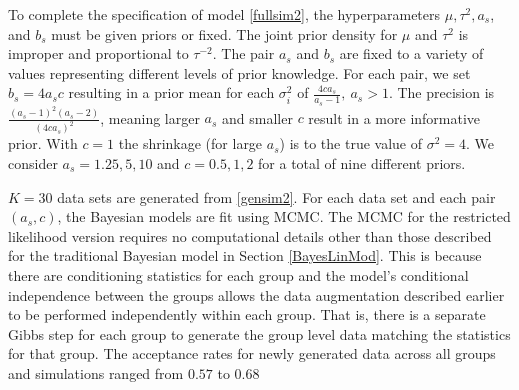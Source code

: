 \documentclass[ba]{imsart}
\newcommand{\response}[1]{{\color{blue}#1}}
\begin{document}
To complete the specification of model \eqref{fullsim2}, the hyperparameters $\mu, \tau^{2}, a_{s}$, and $b_{s}$ must be given priors or fixed. The joint prior density for $\mu$ and $\tau^{2}$ is improper and proportional to $\tau^{-2}$. The pair $a_{s}$ and $b_{s}$ are fixed to a variety of values representing different levels of prior knowledge. For each pair, we set $b_{s} = 4a_{s}c$ resulting in a prior mean for each $\sigma^{2}_{i}$ of $\frac{4ca_{s}}{a_{s}-1}, \ a_{s} >1$. The precision is $\frac{(a_{s} -1)^{2}(a_{s}-2)}{(4ca_{s})^{2}}$, meaning larger $a_{s}$ and smaller $c$ result in a more informative prior. With $c = 1$ the shrinkage (for large $a_{s}$) is to the true value of $\sigma^{2} = 4$. We consider $a_{s} = 1.25,  5, 10$ and $c = 0.5, 1, 2$ for a total of nine different priors. 


$K = 30$ data sets are generated from \eqref{gensim2}. For each data set and each pair $(a_{s}, c)$, the Bayesian models are fit using MCMC. The MCMC for the restricted likelihood version requires no computational details other than those described for the traditional Bayesian model in Section \ref{BayesLinMod}. This is because there are conditioning statistics for each group and the model's conditional independence between the groups allows the data augmentation described earlier to be performed independently within each group. That is, there is a separate Gibbs step for each group to generate the group level data matching the statistics for that group. \response{The acceptance rates for newly generated data across all groups and simulations ranged from $0.57$ to $0.68$}
\end{document}
